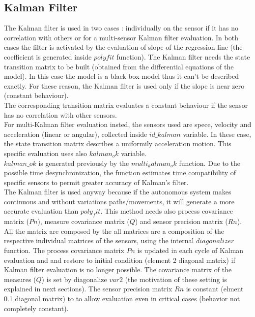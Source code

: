 \documentclass[journal]{IEEEtran}
\begin{document}
\subsection{Kalman Filter}
The Kalman filter is used in two cases : individually on the sensor if it has no correlation with others or for a multi-sensor Kalman filter evaluation. In both cases the filter is activated by the evaluation of slope of the regression line (the coefficient is generated inside \(polyfit\) function). 
The Kalman filter needs the state transition matrix to be built (obtained from the differential equations of the model). In this case the model is a black box model thus it can't be described exactly. For these reason, the Kalman filter is used only if the slope is near zero (constant behaviour).
\\The corresponding transition matrix evaluates a constant behaviour if the sensor has no correlation with other sensors.
\\For multi-Kalman filter evaluation insted, the sensors used are spece, velocity and acceleration (linear or angular), collected inside \(id\_kalman\) variable. 
In these case, the state transition matrix describes a uniformily acceleration motion. This specific evaluation uses also \(kalman_ok\) variable.
\\ \(kalman\_ok\) is generated previously by the \(multi_kalman_ok\) function. Due to the possible time desynchronization, the function estimates time compatibility of specific sensors to permit greater accuracy of Kalman's filter.
\\
The Kalman filter is used anyway because if the autonomous system makes continuous and without variations paths/movements, it will generate a more accurate evaluation than \(poly_fit\).
This method needs also process covariance matrix (\(Pn\)), measure covariance matrix (\(Q\)) and sensor precision matrix (\(Rn\)).
All the matrix are composed by the all matrices are a composition of the respective individual matrices of the sensors, using the internal \(diagonalizer\) function.
The process covariance matrix \(Pn\) is updated in each cycle of Kalman evaluation and and restore to initial condition (element 2 diagonal matrix) if Kalman filter evaluation is no longer possible.
The covariance matrix of the measures (\(Q\)) is set by diagonalize \(var2\) (the motivation of these setting is explained in next sections).
The sensor precision matrix \(Rn\) is constant (elment 0.1 diagonal matrix) to to allow evaluation even in critical cases (behavior not completely constant).
\end{document}
